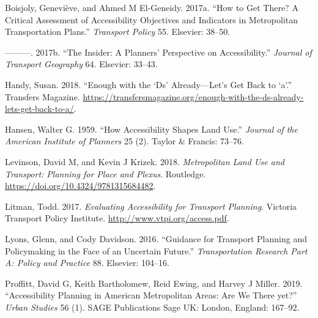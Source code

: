 \documentclass[12pt,]{article}
\begin{document}
\hypertarget{refs}{}
\leavevmode\hypertarget{ref-boisjoly2017get}{}%
Boisjoly, Geneviève, and Ahmed M El-Geneidy. 2017a. ``How to Get There?
A Critical Assessment of Accessibility Objectives and Indicators in
Metropolitan Transportation Plans.'' \emph{Transport Policy} 55.
Elsevier: 38--50.

\leavevmode\hypertarget{ref-boisjoly2017insider}{}%
---------. 2017b. ``The Insider: A Planners' Perspective on
Accessibility.'' \emph{Journal of Transport Geography} 64. Elsevier:
33--43.

\leavevmode\hypertarget{ref-handy2018enough}{}%
Handy, Susan. 2018. ``Enough with the `Ds' Already---Let's Get Back to
`a'.'' Transfers Magazine.
\url{https://transfersmagazine.org/enough-with-the-ds-already-lets-get-back-to-a/}.

\leavevmode\hypertarget{ref-hansen1959accessibility}{}%
Hansen, Walter G. 1959. ``How Accessibility Shapes Land Use.''
\emph{Journal of the American Institute of Planners} 25 (2). Taylor \&
Francis: 73--76.

\leavevmode\hypertarget{ref-levinson2018metropolitan}{}%
Levinson, David M, and Kevin J Krizek. 2018. \emph{Metropolitan Land Use
and Transport: Planning for Place and Plexus}. Routledge.
\url{https://doi.org/10.4324/9781315684482}.

\leavevmode\hypertarget{ref-litman2017evaluating}{}%
Litman, Todd. 2017. \emph{Evaluating Accessibility for Transport
Planning}. Victoria Transport Policy Institute.
\url{http://www.vtpi.org/access.pdf}.

\leavevmode\hypertarget{ref-lyons2016guidance}{}%
Lyons, Glenn, and Cody Davidson. 2016. ``Guidance for Transport Planning
and Policymaking in the Face of an Uncertain Future.''
\emph{Transportation Research Part A: Policy and Practice} 88. Elsevier:
104--16.

\leavevmode\hypertarget{ref-proffitt2019accessibility}{}%
Proffitt, David G, Keith Bartholomew, Reid Ewing, and Harvey J Miller.
2019. ``Accessibility Planning in American Metropolitan Areas: Are We
There yet?'' \emph{Urban Studies} 56 (1). SAGE Publications Sage UK:
London, England: 167--92.
\end{document}

